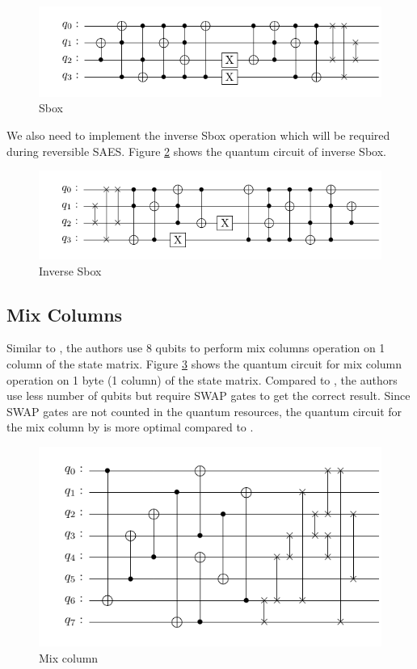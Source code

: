 \documentclass[preprint]{transcrypto}
\begin{document}
\begin{figure}[h!]
    \centering
    \includegraphics[width=1\linewidth]{saes21/sbox.pdf}
    \caption{Sbox}
    \label{fig:sb21}
\end{figure}

We also need to implement the inverse Sbox operation which will be required during reversible SAES. Figure \ref{fig:isb21} shows the quantum circuit of inverse Sbox.

\begin{figure}[h!]
    \centering
    \includegraphics[width=1\linewidth]{saes21/inv_sbox.pdf}
    \caption{Inverse Sbox}
    \label{fig:isb21}
\end{figure}

\subsection{Mix Columns}

Similar to \cite{Almazrooie}, the authors use 8 qubits to perform mix columns operation on 1 column of the state matrix. Figure \ref{fig:mc21} shows the quantum circuit for mix column operation on 1 byte (1 column) of the state matrix. Compared to \cite{Almazrooie}, the authors use less number of qubits but require SWAP gates to get the correct result. Since SWAP gates are not counted in the quantum resources, the quantum circuit for the mix column by \cite{Jang} is more optimal compared to \cite{Almazrooie}.


\begin{figure}[h!]
    \centering
    \includegraphics[width=0.7\linewidth]{saes21/mc.pdf}
    \caption{Mix column}
    \label{fig:mc21}
\end{figure}
\end{document}

